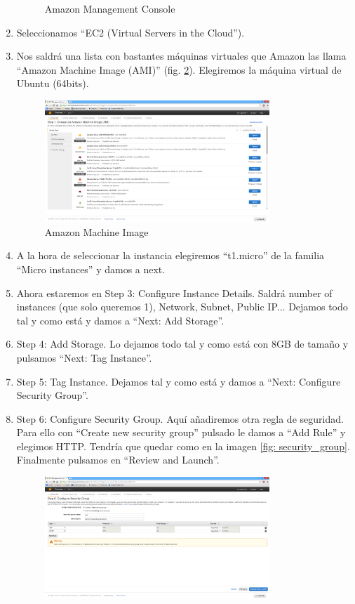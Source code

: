 \documentclass[a4paper,10pt]{scrartcl}
\begin{document}
\begin{enumerate}
\begin{figure}[htb!]
		\caption{Amazon Management Console}
		\label{fig: amc}
	\end{figure}
	\item Seleccionamos ``EC2 (Virtual Servers in the Cloud''). 
	\item Nos saldrá una lista con bastantes máquinas virtuales que Amazon las llama ``Amazon Machine Image (AMI)'' (fig. \ref{fig: ami}). Elegiremos la máquina virtual de Ubuntu (64bits).
	\begin{figure}[htb!]
		\centering
		\includegraphics[width=0.8\textwidth] {ami.png}
		\caption{Amazon Machine Image}
		\label{fig: ami}
	\end{figure}
	\item A la hora de seleccionar la instancia elegiremos ``t1.micro'' de la familia ``Micro instances'' y damos a next.
	\item Ahora estaremos en Step 3: Configure Instance Details. Saldrá number of instances (que solo queremos 1), Network, Subnet, Public IP... Dejamos todo tal y como está y damos a ``Next: Add Storage''. 
	\item Step 4: Add Storage. Lo dejamos todo tal y como está con 8GB de tamaño y pulsamos ``Next: Tag Instance''. 
	\item Step 5: Tag Instance. Dejamos tal y como está y damos a ``Next: Configure Security Group''.
	\item Step 6: Configure Security Group. Aquí añadiremos otra regla de seguridad. Para ello con ``Create new security group'' pulsado le damos a ``Add Rule'' y elegimos HTTP.  Tendría que quedar como en la imagen \ref{fig: security_group}. Finalmente pulsamos en ``Review and Launch''.	
		\begin{figure}[htb!]
		\centering
		\includegraphics[width=0.8\textwidth] {security_group.png}

\end{figure}
\end{enumerate}
\end{document}
